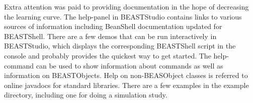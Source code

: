 \documentclass[twoside,11pt]{article}
\begin{document}
Extra attention was paid to providing documentation in the hope of decreasing the learning curve. The help-panel in BEASTStudio contains links to various sources of information including BeanShell documentation updated for BEASTShell.
There are a few demos that can be run interactively in BEASTStudio, which displays the corresponding BEASTShell script in the console and probably provides the quickest way to get started. The help-command can be used to show information about commands as well as information on BEASTObjects. Help on non-BEASObject classes is referred to online javadocs for standard libraries. There are a few examples in the example directory, including one for doing a simulation study.



\vskip 0.2in

\end{document}
